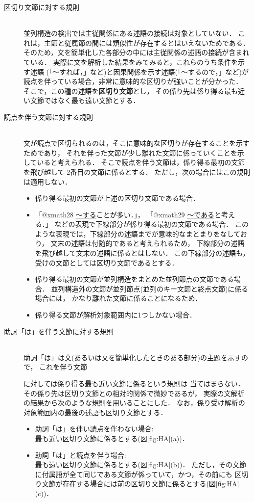 {\unitlength=1mm
}

\begin{description}
  \item[区切り文節に対する規則]　\\
並列構造の検出では主従関係にある述語の接続は対象としていない．
これは，主節と従属節の間には類似性が存在するとはいえないためである．
そのため，文を簡単化した各部分の中には主従関係の述語の接続が含まれている．
実際に文を解析した結果をみてみると，これらのうち条件を示す述語
(「〜すれば，」など)と因果関係を示す述語(「〜するので，」など)が
読点を伴っている場合，非常に意味的な区切りが強いことが分かった．
そこで，この種の述語を{\bf 区切り文節}とし，
その係り先は係り得る最も近い文節ではなく最も遠い文節とする．
  \item[読点を伴う文節に対する規則]　\\
文が読点で区切られるのは，そこに意味的な区切りが存在することを示すためであり，
それを伴った文節が少し離れた文節に係っていくことを示していると考えられる．
そこで読点を伴う文節は，係り得る最初の文節を飛び越して
2番目の文節に係るとする．
ただし，次の場合にはこの規則は適用しない．
\begin{itemize}
  \item 
係り得る最初の文節が上述の区切り文節である場合．
  \item 
「@xmath28 \underline{〜する}ことが多い．」，
「@xmath29 \underline{〜である}と考える．」
などの表現で下線部分が係り得る最初の文節である場合．
このような表現では，下線部分の述語までが意味的なまとまりをなしており，
文末の述語は付随的であると考えられるため，
下線部分の述語を飛び越して文末の述語に係るとはしない．
この下線部分の述語も，受けの文節としては区切り文節であるとする．
  \item 
係り得る最初の文節が並列構造をまとめた並列節点の文節である場合．
並列構造外の文節が並列節点(並列のキー文節と終点文節)に係る場合には，
かなり離れた文節に係ることになるため．
  \item 
係り得る文節が解析対象範囲内に1つしかない場合．
\end{itemize}
  \item[助詞「は」を伴う文節に対する規則]　\\
助詞「は」は文(あるいは文を簡単化したときのある部分)の主題を示すので，
これを伴う文節

に対しては係り得る最も近い文節に係るという規則は
当てはまらない．
その係り先は区切り文節との相対的関係で微妙であるが，
実際の文解析の結果から次のような規則を用いることにした．
なお，係り受け解析の対象範囲内の最後の述語も区切り文節とする．
\begin{itemize}
  \item 助詞「は」を伴い読点を伴わない場合: \\
最も近い区切り文節に係るとする(図[fig:HA](a))．
  \item 助詞「は」と読点を伴う場合: \\
最も遠い区切り文節に係るとする(図[fig:HA](b))．
ただし，その文節に付属語が全て同じである文節が係っていて，かつ，その前にも
区切り文節が存在する場合には前の区切り文節に係るとする(図[fig:HA](c))．
\end{itemize}
\end{description}

